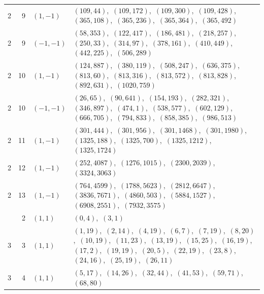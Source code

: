 \documentclass[11pt]{article}
\begin{document}
\begin{longtable}{@{}rrl>{\raggedright\arraybackslash}p{}@{}}
2 & 9 & $(1,-1)$ & $(109,44)$,\allowbreak\ $(109,172)$,\allowbreak\ $(109,300)$,\allowbreak\ $(109,428)$,\allowbreak\ $(365,108)$,\allowbreak\ $(365,236)$,\allowbreak\ $(365,364)$,\allowbreak\ $(365,492)$\\
2 & 9 & $(-1,-1)$ & $(58,353)$,\allowbreak\ $(122,417)$,\allowbreak\ $(186,481)$,\allowbreak\ $(218,257)$,\allowbreak\ $(250,33)$,\allowbreak\ $(314,97)$,\allowbreak\ $(378,161)$,\allowbreak\ $(410,449)$,\allowbreak\ $(442,225)$,\allowbreak\ $(506,289)$\\
2 & 10 & $(1,-1)$ & $(124,887)$,\allowbreak\ $(380,119)$,\allowbreak\ $(508,247)$,\allowbreak\ $(636,375)$,\allowbreak\ $(813,60)$,\allowbreak\ $(813,316)$,\allowbreak\ $(813,572)$,\allowbreak\ $(813,828)$,\allowbreak\ $(892,631)$,\allowbreak\ $(1020,759)$\\
2 & 10 & $(-1,-1)$ & $(26,65)$,\allowbreak\ $(90,641)$,\allowbreak\ $(154,193)$,\allowbreak\ $(282,321)$,\allowbreak\ $(346,897)$,\allowbreak\ $(474,1)$,\allowbreak\ $(538,577)$,\allowbreak\ $(602,129)$,\allowbreak\ $(666,705)$,\allowbreak\ $(794,833)$,\allowbreak\ $(858,385)$,\allowbreak\ $(986,513)$\\
2 & 11 & $(1,-1)$ & $(301,444)$,\allowbreak\ $(301,956)$,\allowbreak\ $(301,1468)$,\allowbreak\ $(301,1980)$,\allowbreak\ $(1325,188)$,\allowbreak\ $(1325,700)$,\allowbreak\ $(1325,1212)$,\allowbreak\ $(1325,1724)$\\
2 & 12 & $(1,-1)$ & $(252,4087)$,\allowbreak\ $(1276,1015)$,\allowbreak\ $(2300,2039)$,\allowbreak\ $(3324,3063)$\\
2 & 13 & $(1,-1)$ & $(764,4599)$,\allowbreak\ $(1788,5623)$,\allowbreak\ $(2812,6647)$,\allowbreak\ $(3836,7671)$,\allowbreak\ $(4860,503)$,\allowbreak\ $(5884,1527)$,\allowbreak\ $(6908,2551)$,\allowbreak\ $(7932,3575)$\\
\addlinespace[3pt]
3 & 2 & $(1,1)$ & $(0,4)$,\allowbreak\ $(3,1)$\\
3 & 3 & $(1,1)$ & $(1,19)$,\allowbreak\ $(2,14)$,\allowbreak\ $(4,19)$,\allowbreak\ $(6,7)$,\allowbreak\ $(7,19)$,\allowbreak\ $(8,20)$,\allowbreak\ $(10,19)$,\allowbreak\ $(11,23)$,\allowbreak\ $(13,19)$,\allowbreak\ $(15,25)$,\allowbreak\ $(16,19)$,\allowbreak\ $(17,2)$,\allowbreak\ $(19,19)$,\allowbreak\ $(20,5)$,\allowbreak\ $(22,19)$,\allowbreak\ $(23,8)$,\allowbreak\ $(24,16)$,\allowbreak\ $(25,19)$,\allowbreak\ $(26,11)$\\
3 & 4 & $(1,1)$ & $(5,17)$,\allowbreak\ $(14,26)$,\allowbreak\ $(32,44)$,\allowbreak\ $(41,53)$,\allowbreak\ $(59,71)$,\allowbreak\ $(68,80)$\\

\end{longtable}
\end{document}
